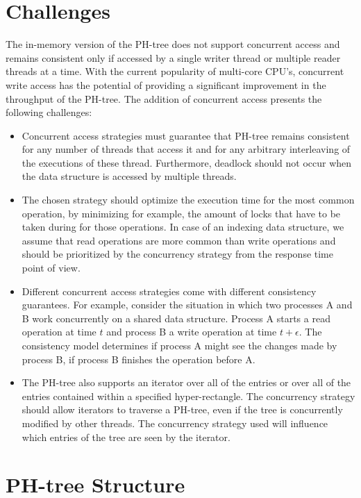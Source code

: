 \documentclass[11pt,a4paper]{globis-book}
\begin{document}
\section{Challenges}
The in-memory version of the PH-tree does not support concurrent access and remains consistent only if accessed by a single writer thread or multiple reader threads at a time. With the current popularity of multi-core CPU's, concurrent write access has the potential of providing a significant improvement in the throughput of the PH-tree. The addition of concurrent access presents the following challenges:
\begin{itemize}
    \item Concurrent access strategies must guarantee that PH-tree remains consistent for any number of threads that access it and for any arbitrary interleaving of the executions of these thread. Furthermore, deadlock should not occur when the data structure is accessed by multiple threads.
    \item The chosen strategy should optimize the execution time for the most common operation, by minimizing for example, the amount of locks that have to be taken during for those operations. In case of an indexing data structure, we assume that read operations are more common than write operations and should be prioritized by the concurrency strategy from the response time point of view.
    \item Different concurrent access strategies come with different consistency guarantees. For example, consider the situation in which two processes A and B work concurrently on a shared data structure. Process A starts a read operation at time $t$ and process B a write operation at time $t + \epsilon$. The consistency model determines if process A might see the changes made by process B, if process B finishes the operation before A.
    \item The PH-tree also supports an iterator over all of the entries or over all of the entries contained within a specified hyper-rectangle. The concurrency strategy should allow iterators to traverse a PH-tree, even if the tree is concurrently modified by other threads. The concurrency strategy used will influence which entries of the tree are seen by the iterator.
\end{itemize}

\section{PH-tree Structure}
\end{document}

